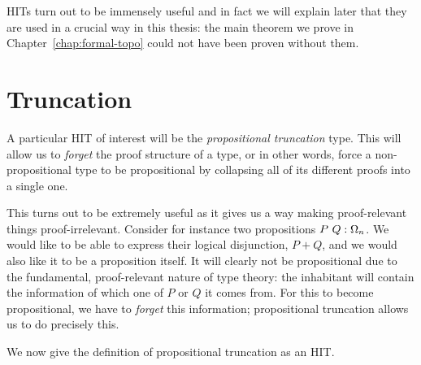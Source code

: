 HITs turn out to be immensely useful and in fact we will explain later that they are used
in a crucial way in this thesis: the main theorem we prove in
Chapter~\ref{chap:formal-topo} could not have been proven without them.

\section{Truncation}

A particular HIT of interest will be the \emph{propositional truncation} type. This will
allow us to \emph{forget} the proof structure of a type, or in other words, force a
non-propositional type to be propositional by collapsing all of its different proofs into
a single one.

This turns out to be extremely useful as it gives us a way making proof-relevant things
proof-irrelevant. Consider for instance two propositions $P~Q:\Omega_n$. We would
like to be able to express their logical disjunction, $P + Q$, and we would also like it
to be a proposition itself. It will clearly not be propositional due to the fundamental,
proof-relevant nature of type theory: the inhabitant will contain the information of which
one of $P$ or $Q$ it comes from. For this to become propositional, we have to
\emph{forget} this information; propositional truncation allows us to do precisely this.

We now give the definition of propositional truncation as an HIT.

\begin{defn}\label{defn:truncation}
\end{defn}
